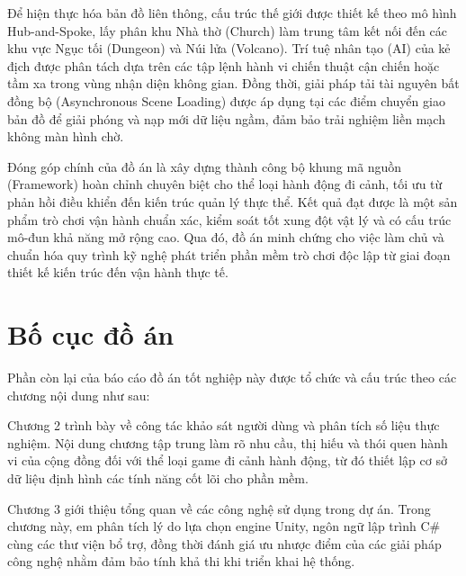 \documentclass[../DoAn.tex]{subfiles}
\begin{document}
Để hiện thực hóa bản đồ liên thông, cấu trúc thế giới được thiết kế theo mô hình Hub-and-Spoke, lấy phân khu Nhà thờ (Church) làm trung tâm kết nối đến các khu vực Ngục tối (Dungeon) và Núi lửa (Volcano). Trí tuệ nhân tạo (AI) của kẻ địch được phân tách dựa trên các tập lệnh hành vi chiến thuật cận chiến hoặc tầm xa trong vùng nhận diện không gian. Đồng thời, giải pháp tải tài nguyên bất đồng bộ (Asynchronous Scene Loading) được áp dụng tại các điểm chuyển giao bản đồ để giải phóng và nạp mới dữ liệu ngầm, đảm bảo trải nghiệm liền mạch không màn hình chờ.


Đóng góp chính của đồ án là xây dựng thành công bộ khung mã nguồn (Framework) hoàn chỉnh chuyên biệt cho thể loại hành động đi cảnh, tối ưu từ phản hồi điều khiển đến kiến trúc quản lý thực thể. Kết quả đạt được là một sản phẩm trò chơi vận hành chuẩn xác, kiểm soát tốt xung đột vật lý và có cấu trúc mô-đun khả năng mở rộng cao. Qua đó, đồ án minh chứng cho việc làm chủ và chuẩn hóa quy trình kỹ nghệ phát triển phần mềm trò chơi độc lập từ giai đoạn thiết kế kiến trúc đến vận hành thực tế.
\section{Bố cục đồ án}
\label{section:1.5}

Phần còn lại của báo cáo đồ án tốt nghiệp này được tổ chức và cấu trúc theo các chương nội dung như sau:

Chương 2 trình bày về công tác khảo sát người dùng và phân tích số liệu thực nghiệm. Nội dung chương tập trung làm rõ nhu cầu, thị hiếu và thói quen hành vi của cộng đồng đối với thể loại game đi cảnh hành động, từ đó thiết lập cơ sở dữ liệu định hình các tính năng cốt lõi cho phần mềm.

Chương 3 giới thiệu tổng quan về các công nghệ sử dụng trong dự án. Trong chương này, em phân tích lý do lựa chọn engine Unity, ngôn ngữ lập trình C\# cùng các thư viện bổ trợ, đồng thời đánh giá ưu nhược điểm của các giải pháp công nghệ nhằm đảm bảo tính khả thi khi triển khai hệ thống.
\end{document}
